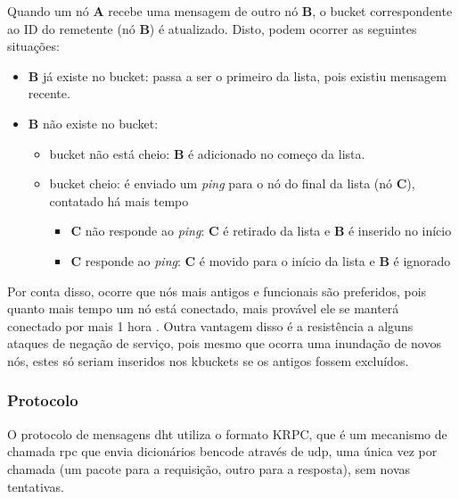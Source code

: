 \begin{itemize}
Quando um nó \textbf{A} recebe uma mensagem de outro nó \textbf{B}, o \gls*{bucket}
correspondente ao ID do remetente (nó \textbf{B}) é atualizado. Disto, podem ocorrer as
seguintes situações:

\newpage
\begin{itemize}
    \item \textbf{B} já existe no \gls*{bucket}: passa a ser o primeiro da lista, pois
        existiu mensagem recente.

    \item \textbf{B} não existe no \gls*{bucket}:
        \begin{itemize}
            \item \gls*{bucket} não está cheio: \textbf{B} é adicionado no começo da
                lista.
            \item \gls*{bucket} cheio: é enviado um \emph{ping} para o nó do final da
                lista (nó \textbf{C}), contatado há mais tempo

            \begin{itemize}
                \item \textbf{C} não responde ao \emph{ping}: \textbf{C} é retirado da
                lista e \textbf{B} é inserido no início
                \item \textbf{C} responde ao \emph{ping}: \textbf{C} é movido para o
                início da lista e \textbf{B} é ignorado
            \end{itemize}
        \end{itemize}

\end{itemize}

Por conta disso, ocorre que nós mais antigos e funcionais são preferidos, pois quanto
mais tempo um nó está conectado, mais provável ele se manterá conectado por mais 1 hora
\cite{artigo:gnutella-uptime}. Outra vantagem disso é a resistência a alguns ataques de
negação de serviço, pois mesmo que ocorra uma inundação de novos nós, estes só seriam
inseridos nos \glspl*{kbucket} se os antigos fossem excluídos.

\subsubsection*{Protocolo}

O protocolo de mensagens \gls*{dht} utiliza o formato KRPC, que é um mecanismo de
chamada \gls{rpc} que envia dicionários \gls*{bencode} através de \gls*{udp}, uma única
vez por chamada (um pacote para a requisição, outro para a resposta), sem novas
tentativas.


\end{itemize}
